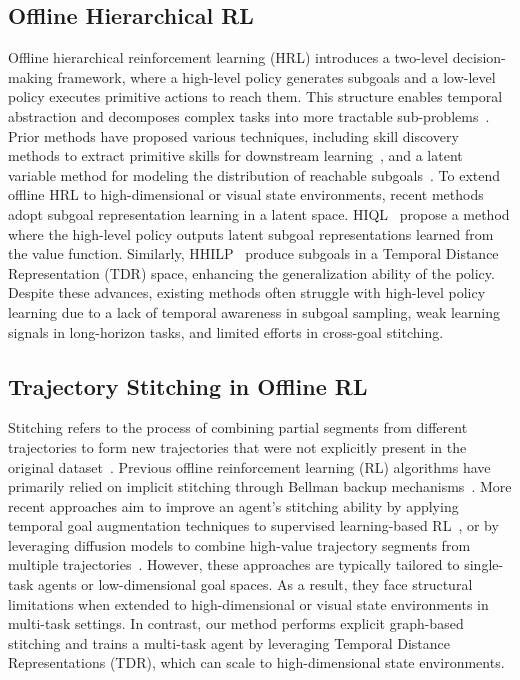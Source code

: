 \documentclass{article}
\begin{document}
\subsection{Offline Hierarchical RL}
Offline hierarchical reinforcement learning (HRL) introduces a two-level decision-making framework, where a high-level policy generates subgoals and a low-level policy executes primitive actions to reach them. This structure enables temporal abstraction and decomposes complex tasks into more tractable sub-problems~\cite{haarnoja2018latent, nachum2019near, zhang2020generating}. Prior methods have proposed various techniques, including skill discovery methods to extract primitive skills for downstream learning~\cite{ajay2021opal, li2024boosting}, and a latent variable method for modeling the distribution of reachable subgoals~\cite{shin2023guide}. To extend offline HRL to high-dimensional or visual state environments, recent methods adopt subgoal representation learning in a latent space. HIQL~\cite{park2023hiql} propose a method where the high-level policy outputs latent subgoal representations learned from the value function. Similarly, HHILP~\cite{park2024foundation} produce subgoals in a Temporal Distance Representation (TDR) space, enhancing the generalization ability of the policy. Despite these advances, existing methods often struggle with high-level policy learning due to a lack of temporal awareness in subgoal sampling, weak learning signals in long-horizon tasks, and limited efforts in cross-goal stitching.

\subsection{Trajectory Stitching in Offline RL}
Stitching refers to the process of combining partial segments from different trajectories to form new trajectories that were not explicitly present in the original dataset~\cite{fu2020d4rl, park2025ogbench}. Previous offline reinforcement learning (RL) algorithms have primarily relied on implicit stitching through Bellman backup mechanisms~\cite{fujimoto2019off, wu2019behavior, kumar2020conservative, levine2020offline}. More recent approaches aim to improve an agent’s stitching ability by applying temporal goal augmentation techniques to supervised learning-based RL~\cite{ghugare2024temporal}, or by leveraging diffusion models to combine high-value trajectory segments from multiple trajectories~\cite{li2024diffstitch, kim2024ssd}. However, these approaches are typically tailored to single-task agents or low-dimensional goal spaces. As a result, they face structural limitations when extended to high-dimensional or visual state environments in multi-task settings. In contrast, our method performs explicit graph-based stitching and trains a multi-task agent by leveraging Temporal Distance Representations (TDR), which can scale to high-dimensional state environments.
 
\end{document}
